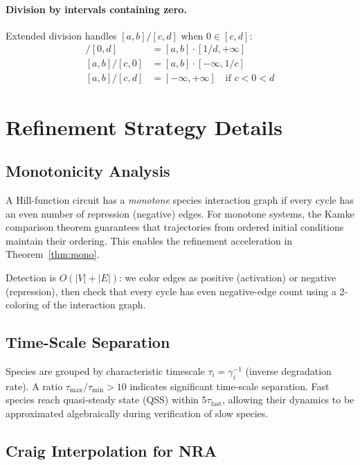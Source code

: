 \documentclass[11pt]{article}
\begin{document}
\paragraph{Division by intervals containing zero.}
Extended division handles $[a,b]/[c,d]$ when $0 \in [c,d]$:
\begin{align}
[a,b] / [0, d] &= [a,b] \cdot [1/d, +\infty] \\
[a,b] / [c, 0] &= [a,b] \cdot [-\infty, 1/c] \\
[a,b] / [c, d] &= [-\infty, +\infty] \quad\text{if } c < 0 < d
\end{align}

\section{Refinement Strategy Details}
\label{app:refinement}

\subsection{Monotonicity Analysis}

A Hill-function circuit has a \emph{monotone} species interaction
graph if every cycle has an even number of repression (negative)
edges. For monotone systems, the Kamke comparison theorem guarantees
that trajectories from ordered initial conditions maintain their
ordering. This enables the refinement acceleration in
Theorem~\ref{thm:mono}.

Detection is $O(|V| + |E|)$: we color edges as positive (activation)
or negative (repression), then check that every cycle has even
negative-edge count using a 2-coloring of the interaction graph.

\subsection{Time-Scale Separation}

Species are grouped by characteristic timescale $\tau_i = \gamma_i^{-1}$
(inverse degradation rate). A ratio $\tau_{\max}/\tau_{\min} > 10$
indicates significant time-scale separation. Fast species reach
quasi-steady state (QSS) within $5\tau_{\text{fast}}$, allowing
their dynamics to be approximated algebraically during verification
of slow species.

\subsection{Craig Interpolation for NRA}
\end{document}
